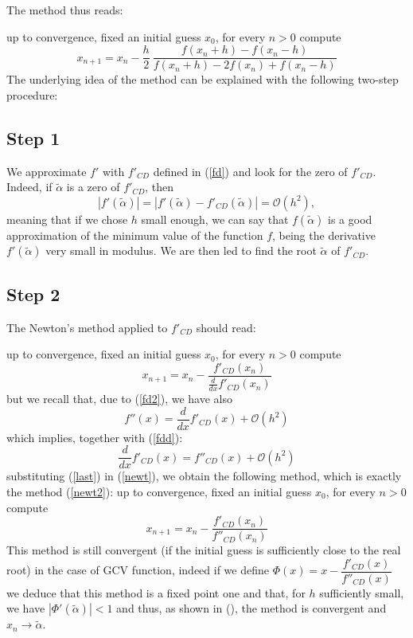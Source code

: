 \documentclass[a4paper,11 pt]{report}
\theoremstyle{plain}
\theoremstyle{definition}
\theoremstyle{remark}
\begin{document}
The method thus reads:

up to convergence, fixed an initial guess $x_0$, for every $n>0$ compute
\begin{equation}
x_{n+1}=x_n-\frac{h}{2}\ \dfrac{f(x_n+h)-f(x_n-h)}{f(x_n+h)-2f(x_n)+f(x_n-h)}
\label{newt2}
\end{equation}
The underlying idea of the method can be explained with the following two-step procedure: 
\subsection*{Step 1}
We approximate $f'$ with $f'_{CD}$ defined in (\ref{fd}) and look for the zero of $f'_{CD}$. Indeed, if $\tilde{\alpha}$ is a zero of $f'_{CD}$, then 
\begin{equation*}
|f'(\tilde{\alpha})|= |f'(\tilde{\alpha})-f'_{CD}(\tilde{\alpha})|=\mathcal{O}(h^2),
\end{equation*} 
meaning that if we chose $h$ small enough, we can say that $f(\tilde{\alpha})$ is a good approximation of the minimum value of the function $f$, being the derivative $f'(\tilde{\alpha})$ very small in modulus. 
We are then led to find the root $\tilde{\alpha}$ of $f'_{CD}$.
\subsection*{Step 2}
The Newton's method applied to $f'_{CD}$ should read:


up to convergence, fixed an initial guess $x_0$, for every $n>0$ compute
\begin{equation}
x_{n+1}=x_n-\dfrac{f'_{CD}(x_n)}{\frac{d}{dx}f'_{CD}(x_n)}
\label{newt}
\end{equation}
but we recall that, due to (\ref{fd2}), we have also
\begin{equation}
f''(x)=\frac{d}{dx}f'_{CD}(x)+\mathcal{O}(h^2)
\label{eq}
\end{equation}
which implies, together with (\ref{fdd}):
\begin{equation}
\frac{d}{dx}f'_{CD}(x)=f''_{CD}(x)+\mathcal{O}(h^2)
\label{last}
\end{equation} 
substituting (\ref{last}) in (\ref{newt}), we obtain the following method, which is exactly the method (\ref{newt2}):
up to convergence, fixed an initial guess $x_0$, for every $n>0$ compute
\begin{equation}
x_{n+1}=x_n-\dfrac{f'_{CD}(x_n)}{f''_{CD}(x_n)}
\label{newt3}
\end{equation}
This method is still convergent (if the initial guess is sufficiently close to the real root) in the case of GCV function, indeed if we define 
$\Phi(x)=x-\dfrac{f'_{CD}(x)}{f''_{CD}(x)}$ we deduce that this method is a fixed point one and that, for $h$ sufficiently small, we have $|\Phi'(\tilde{\alpha})|<1$ and thus, as shown in (\cite{QSS}), the method is convergent and $x_n\rightarrow\tilde{\alpha}$. 
\end{document}
